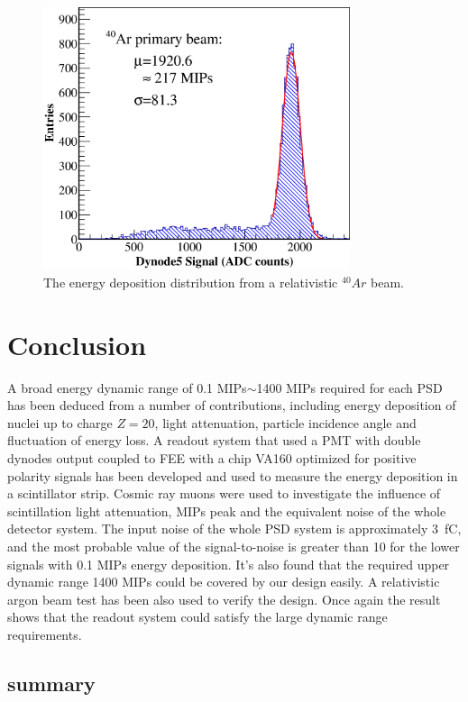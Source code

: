 \documentclass[5p, times]{elsarticle}
\begin{document}
\begin{figure}
 \centering
 \includegraphics[width=90mm]{Ar}
\caption{The energy deposition distribution from a relativistic $^{40}Ar$ beam.}
\label{fig:Ar}
\end{figure} 

\section{Conclusion}
\label{sec:conclustion}

A broad energy dynamic range of 0.1 MIPs$\sim$1400 MIPs required for each PSD has been deduced from a number of contributions, including energy deposition of nuclei up to charge $Z=20$, light attenuation, particle incidence angle and fluctuation of energy loss. 
A readout system that used a PMT with double dynodes output coupled to FEE with a chip VA160 optimized for positive polarity signals has been developed and used to measure the energy deposition in a scintillator strip. 
Cosmic ray muons were used to investigate the influence of scintillation light attenuation, MIPs peak and the equivalent noise of the whole detector system. 
The input noise of the whole PSD system is approximately \SI{3}{\femto\coulomb}, and the most probable value of the signal-to-noise is greater than 10 for the lower signals with 0.1 MIPs energy deposition. 
It’s also found that the required upper dynamic range 1400 MIPs could be covered by our design easily. 
A relativistic argon beam test has been also used to verify the design. 
Once again the result shows that the readout system could satisfy the large dynamic range requirements.

\subsection{summary}
\end{document}
